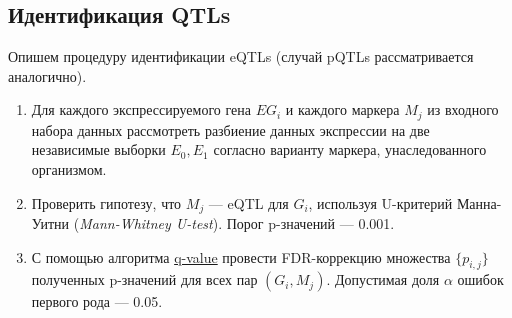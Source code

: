 \documentclass[11pt,a4paper]{report}
\theoremstyle{definition}
\theoremstyle{definition}
\theoremstyle{definition}
\begin{document}
	\subsection{Идентификация QTLs}
	Опишем процедуру идентификации eQTLs (случай pQTLs рассматривается аналогично). 
	\begin{enumerate}
		\item Для каждого экспрессируемого гена $ EG_{i} $ и каждого маркера $ M_{j} $ из входного набора данных рассмотреть разбиение данных экспрессии на две независимые выборки $ E_{0}, E_{1} $ согласно варианту маркера, унаследованного организмом. 
		\item Проверить гипотезу, что $ M_{j} $ — eQTL для $ G_{i} $, используя U-критерий Манна-Уитни (\textit{Mann-Whitney U-test}). Порог p-значений — 0.001.
		\item С помощью алгоритма \href{https://github.com/StoreyLab/qvalue}{q-value} провести FDR-коррекцию множества $ \{ p_{i, j} \} $ полученных p-значений для всех пар $ (G_{i}, M_{j}) $. Допустимая доля $ \alpha $ ошибок первого рода — 0.05.
	\end{enumerate}
\end{document}
